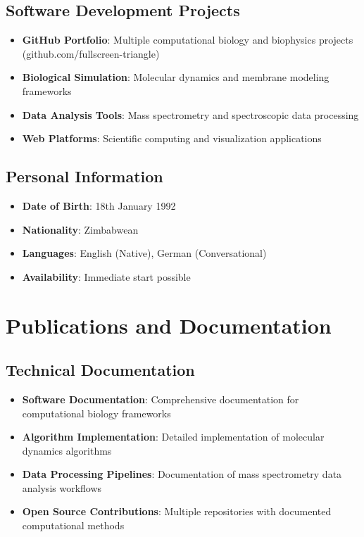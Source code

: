 \documentclass[11pt,a4paper]{article}
\begin{document}
\subsection{Software Development Projects}
\begin{itemize}[leftmargin=*,itemsep=0.1em]
\item \textbf{GitHub Portfolio}: Multiple computational biology and biophysics projects (github.com/fullscreen-triangle)
\item \textbf{Biological Simulation}: Molecular dynamics and membrane modeling frameworks
\item \textbf{Data Analysis Tools}: Mass spectrometry and spectroscopic data processing
\item \textbf{Web Platforms}: Scientific computing and visualization applications
\end{itemize}

\subsection{Personal Information}
\begin{itemize}[leftmargin=*,itemsep=0.1em]
\item \textbf{Date of Birth}: 18th January 1992
\item \textbf{Nationality}: Zimbabwean
\item \textbf{Languages}: English (Native), German (Conversational)
\item \textbf{Availability}: Immediate start possible
\end{itemize}

\section{Publications and Documentation}

\subsection{Technical Documentation}
\begin{itemize}[leftmargin=*,itemsep=0.1em]
\item \textbf{Software Documentation}: Comprehensive documentation for computational biology frameworks
\item \textbf{Algorithm Implementation}: Detailed implementation of molecular dynamics algorithms
\item \textbf{Data Processing Pipelines}: Documentation of mass spectrometry data analysis workflows
\item \textbf{Open Source Contributions}: Multiple repositories with documented computational methods
\end{itemize}
\end{document}
